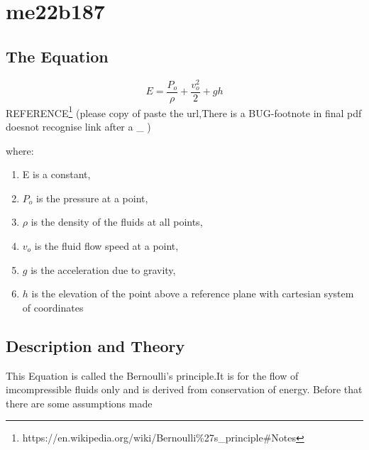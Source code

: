%
\section{me22b187}
\subsection{The Equation}

\begin{equation}
\label{rohan}
	E=\frac{P_o}{\rho} +\frac{v^2_o}{2} + gh
\end{equation}
REFERENCE\footnote[1]{https://en.wikipedia.org/wiki/Bernoulli\%27s\_principle\#Notes}
(please copy of paste the url,There is a BUG-footnote in final pdf doesnot recognise link after a \_ )

where:
\begin{enumerate}
	\item	E is a constant,
	\item	$ P_o $ is the pressure at a point,
	\item   $\rho$ is the density of the fluids at all points,
	\item	$ v_o $ is the fluid flow speed at a point,
	\item	$ g $ is the acceleration due to gravity,
	\item	$ h $ is the elevation of the point above a reference plane with cartesian system of coordinates
\end{enumerate}
\subsection{Description and Theory}
This Equation is called the Bernoulli's principle.It is for the flow of imcompressible fluids only and is derived from conservation of energy.
Before that there are some assumptions made
